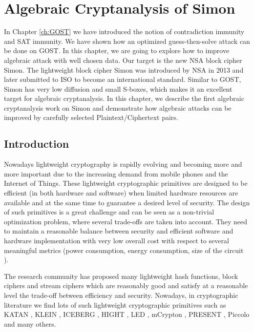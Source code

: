 \chapter{Algebraic Cryptanalysis of Simon}\label{ch:SIMON}
In Chapter \ref{ch:GOST} we have introduced the notion of contradiction immunity and SAT immunity. We have shown how an optimized guess-then-solve attack can be done on GOST. In this chapter, we are going to explore how to improve algebraic attack with well chosen data. Our target is the new NSA block cipher Simon\cite{NSAciphers}. The lightweight block cipher Simon was introduced by NSA in 2013 and later submitted to ISO to become an international standard. Similar to GOST, Simon has very low diffusion and small S-boxes, which makes it an excellent target for algebraic cryptanalysis. In this chapter, we describe the first algebraic cryptanalysis work on Simon and demonstrate how algebraic attacks can be improved by carefully selected Plaintext/Ciphertext pairs. 

\section{Introduction}
Nowadays lightweight cryptography is rapidly evolving and becoming more and more important due to the increasing demand from mobile phones and the Internet of Things. These lightweight cryptographic primitives are designed to
be efficient (in both hardware and software) when limited
hardware resources are available and at the same time to
guarantee a desired level of security. The
design of such primitives is a great challenge and can be
seen as a non-trivial optimization problem, where several
trade-offs are taken into account. They need to maintain
a reasonable balance between security and efficient software and hardware
implementation with very low overall cost with respect to several
meaningful metrics (power consumption, energy consumption, size of the circuit \cite{OptimiPaper,BoyarPeraltaMCMethod,BoyarPeraltaMCBoolean}).

The research community has
proposed many lightweight hash functions, block ciphers and stream ciphers which are
reasonably good and satisfy at a reasonable level the trade-off
between efficiency and security. Nowadays, in cryptographic
literature we find lots of such lightweight cryptographic primitives such as
KATAN \cite{KATAN}, KLEIN \cite{KLEIN}, ICEBERG
\cite{ICEBERG}, HIGHT \cite{HIGHT}, LED \cite{LED},
mCrypton \cite{mCrypton}, PRESENT \cite{PRESENT}, Piccolo \cite{Piccolo}
and many others.

